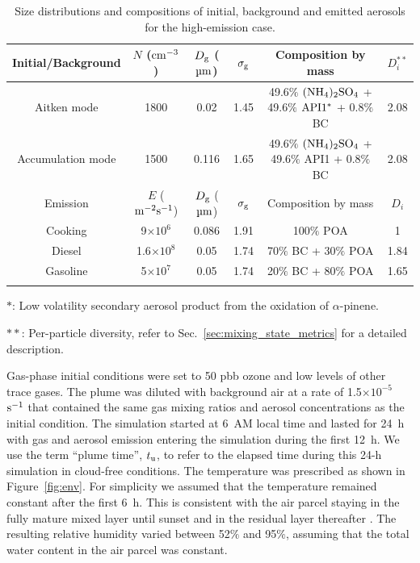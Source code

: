 \documentclass[edeposit,fullpage]{uiucthesis2009}
\begin{document}
\begin{table}[H]
	\centering
	\begin{threeparttable} 
		\caption{Size distributions and compositions of initial,
			background and emitted aerosols for the high-emission case.}
		\vspace*{-5mm}
		\begin{tabular}{c c c c c c}
			\toprule
			Initial/Background & $N$ ($\rm cm^{-3}$)& $D_{\rm g}$ ($\mu{\rm m}$) & $\sigma_{\rm g}$ &  Composition by mass & $D_i^{**}$ \\
			\midrule
			Aitken mode &  1800 & 0.02 & 1.45 & 49.6$\%$ $\rm (NH_4)_2SO_4$ + 49.6$\%$ $\rm API1^*$ + 0.8$\%$ BC & 2.08\\ 
			Accumulation mode & 1500 & 0.116 & 1.65 & 49.6$\%$ $\rm (NH_4)_2SO_4$ + 49.6$\%$ API1 + 0.8$\%$ BC & 2.08 \\
			\midrule
			Emission &  $E$ ($\rm m^{-2} s^{-1}$)& $D_{\rm g}$ ($\mu{\rm m}$) & $\sigma_{\rm g}$  &  Composition by mass &  $D_i$ \\
			\midrule
			Cooking &  9$\times 10^6$ & 0.086 & 1.91 & 100$\%$ POA & 1\\
			Diesel & 1.6$\times 10^8$ & 0.05 & 1.74 & 70$\%$ BC + 30$\%$ POA & 1.84 \\
			Gasoline & 5$\times 10^7$ & 0.05 & 1.74 & 20$\%$ BC + 80$\%$ POA & 1.65\\
			\bottomrule
			\label{tab:emi}
		\end{tabular}
		\vspace*{-5mm}
		\begin{tablenotes}[para,flushleft]
			\small
			\item $*$: Low volatility secondary aerosol product from
				the oxidation of $\alpha$-pinene. \\
			\item $**$: Per-particle diversity, refer to
				Sec.~\ref{sec:mixing_state_metrics} for a detailed
				description.
		\end{tablenotes}
	\end{threeparttable}
\end{table}

Gas-phase initial conditions were set to 50 pbb ozone and low levels
of other trace gases. The plume was diluted with background air at a
rate of 1.5$\times 10^{-5}$ $\rm s^{-1}$ that contained the same gas
mixing ratios and aerosol concentrations as the initial condition. The
simulation started at 6~AM local time and lasted for 24~h with gas and
aerosol emission entering the simulation during the first 12~h. We use
the term ``plume time'', $t_{\rm u}$, to refer to the elapsed time
during this 24-h simulation in cloud-free conditions. The temperature
was prescribed as shown in Figure~\ref{fig:env}. For simplicity we
assumed that the temperature remained constant after the first
6~h. This is consistent with the air parcel staying in the fully
mature mixed layer until sunset and in the residual layer thereafter
\citep{Zaveri2010a}. The resulting relative humidity varied
between 52$\%$ and 95$\%$, assuming that the total water content in
the air parcel was constant.
\end{document}
